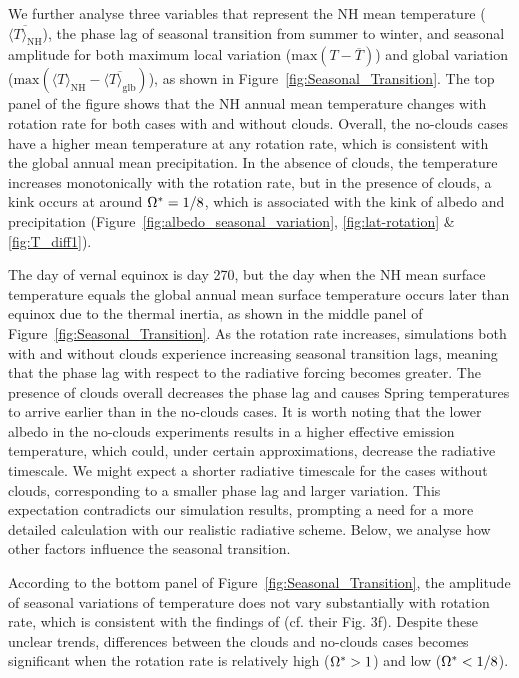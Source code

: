 We further analyse three variables that represent the NH mean temperature ($\overline{\langle T\rangle_\textrm{NH}}$), the phase lag of seasonal transition from summer to winter, and seasonal amplitude for both maximum local variation ($\textrm{max}\left(T-\overline{T}\right)$) and global variation ($\textrm{max}\left(\langle T\rangle_\textrm{NH}-\overline{\langle T\rangle_\textrm{glb}}\right)$), as shown in Figure~\ref{fig:Seasonal_Transition}. The top panel of the figure shows that the NH annual mean temperature changes with rotation rate for both cases with and without clouds. Overall, the no-clouds cases have a higher mean temperature at any rotation rate, which is consistent with the global annual mean precipitation. In the absence of clouds, the temperature increases monotonically with the rotation rate, but in the presence of clouds, a kink occurs at around $\Omega^* = 1/8$, which is associated with the kink of albedo and precipitation (Figure~\ref{fig:albedo_seasonal_variation}, \ref{fig:lat-rotation} \& \ref{fig:T_diff1}).

The day of vernal equinox is day 270, but the day when the NH mean surface temperature equals the global annual mean surface temperature occurs later than equinox due to the thermal inertia, as shown in the middle panel of Figure~\ref{fig:Seasonal_Transition}. As the rotation rate increases, simulations both with and without clouds experience increasing seasonal transition lags, meaning that the phase lag with respect to the radiative forcing becomes greater. The presence of clouds overall decreases the phase lag and causes Spring temperatures to arrive earlier than in the no-clouds cases. It is worth noting that the lower albedo in the no-clouds experiments results in a higher effective emission temperature, which could, under certain approximations, decrease the radiative timescale\citep{mitchell_effects_2014,ohno2019_atmospheres,guendelman2022-Key,tan2022-Weak}. We might expect a shorter radiative timescale for the cases without clouds, corresponding to a smaller phase lag and larger variation. This expectation contradicts our simulation results, prompting a need for a more detailed calculation with our realistic radiative scheme. Below, we analyse how other factors influence the seasonal transition.

According to the bottom panel of Figure~\ref{fig:Seasonal_Transition}, the amplitude of seasonal variations of temperature does not vary substantially with rotation rate, which is consistent with the findings of \citet{guendelman2022-Key} (cf. their Fig. 3f). Despite these unclear trends, differences between the clouds and no-clouds cases becomes significant when the rotation rate is relatively high ($\Omega^*>1$) and low ($\Omega^*<1/8$).



